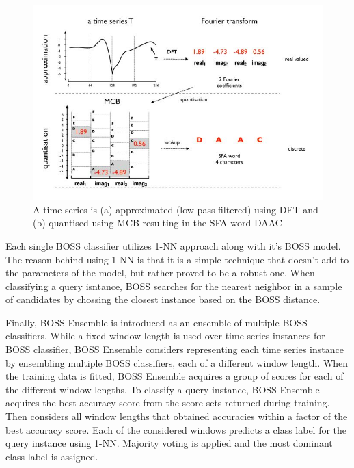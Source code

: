 \begin{figure}
    \captionsetup{justification=raggedright}
    \centering
    \includegraphics[scale = 0.5]{BOSS_SFA.JPG}
    \centering
    \caption{A time series is (a) approximated (low pass filtered) using DFT and (b) quantised using MCB resulting in the SFA word DAAC \cite{schafer2015boss}}
    \label{Img:BOSS_SFA}
\end{figure}

Each single BOSS classifier utilizes 1-NN approach along with it's BOSS model. The reason behind using 1-NN is that it is a simple technique 
that doesn't add to the parameters of the model, but rather proved to be a robust one. When classifying a query isntance, BOSS searches
for the nearest neighbor in a sample of candidates by chossing the closest instance based on the BOSS distance.

Finally, BOSS Ensemble is introduced as an ensemble of multiple BOSS classifiers. While a fixed window length is used over time series instances for BOSS classifier,
BOSS Ensemble considers representing each time series instance by ensembling multiple BOSS classifiers, each of a different window length.
When the training data is fitted, BOSS Ensemble acquires a group of scores for each of the different window lengths.
To classify a query instance, BOSS Ensemble acquires the best accuracy score from the score sets returned during training.
Then considers all window lengths that obtained accuracies within a factor of the best accuracy score.
Each of the considered windows predicts a class label for the query instance using 1-NN. Majority voting is applied and the most dominant
class label is assigned.

